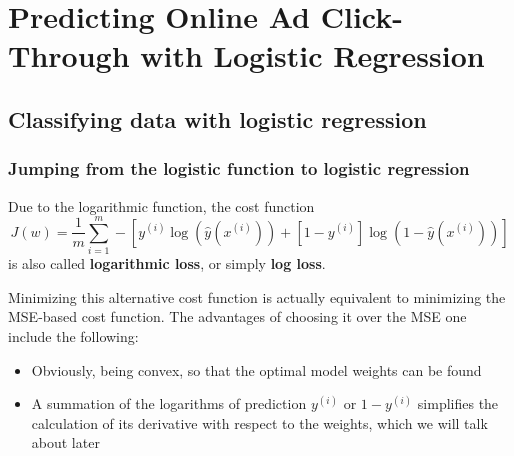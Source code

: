 \chapter{Predicting Online Ad Click-Through with Logistic Regression}
\section{Classifying data with logistic regression}
\subsection{Jumping from the logistic function to logistic regression}
Due to the logarithmic function, the cost function
\begin{equation}
    J(w)=\frac{1}{m}\sum_{i=1}^{m}-[y^{(i)}\log(\hat{y}(x^{(i)}))+[1-y^{(i)}]\log(1-\hat{y}(x^{(i)}))]
\end{equation}
is also called \textbf{logarithmic loss}, or simply \textbf{log loss}.

Minimizing this alternative cost function is actually equivalent to minimizing the MSE-based cost function. The advantages of choosing it over the MSE one include the following:
\begin{itemize}
    \item Obviously, being convex, so that the optimal model weights can be found
    \item A summation of the logarithms of prediction $y^{(i)}$ or $1-y^{(i)}$ simplifies the calculation of its derivative with respect to the weights, which we will talk about later
\end{itemize}